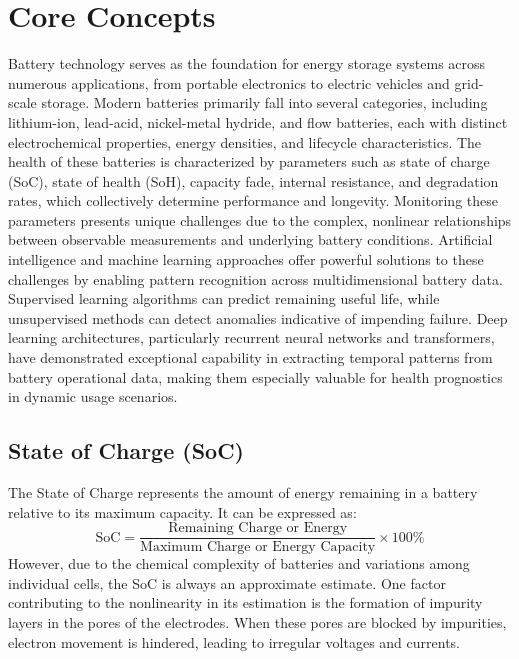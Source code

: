 \section{Core Concepts}
Battery technology serves as the foundation for energy storage systems across numerous applications, from portable electronics to electric vehicles and grid-scale storage. Modern batteries primarily fall into several categories, including lithium-ion, lead-acid, nickel-metal hydride, and flow batteries, each with distinct electrochemical properties, energy densities, and lifecycle characteristics. The health of these batteries is characterized by parameters such as state of charge (SoC), state of health (SoH), capacity fade, internal resistance, and degradation rates, which collectively determine performance and longevity. Monitoring these parameters presents unique challenges due to the complex, nonlinear relationships between observable measurements and underlying battery conditions. Artificial intelligence and machine learning approaches offer powerful solutions to these challenges by enabling pattern recognition across multidimensional battery data. Supervised learning algorithms can predict remaining useful life, while unsupervised methods can detect anomalies indicative of impending failure. Deep learning architectures, particularly recurrent neural networks and transformers, have demonstrated exceptional capability in extracting temporal patterns from battery operational data, making them especially valuable for health prognostics in dynamic usage scenarios.


\subsection{State of Charge (SoC)}
The State of Charge represents the amount of energy remaining in a battery relative to its maximum capacity. It can be expressed as:
\begin{equation}
\text{SoC} = \frac{\text{Remaining Charge or Energy}}{\text{Maximum Charge or Energy Capacity}} \times 100\%
\end{equation}
However, due to the chemical complexity of batteries and variations among individual cells, the SoC is always an approximate estimate. One factor contributing to the nonlinearity in its estimation is the formation of impurity layers in the pores of the electrodes. When these pores are blocked by impurities, electron movement is hindered, leading to irregular voltages and currents.

